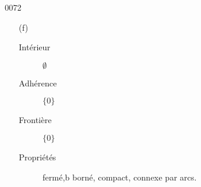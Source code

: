 \begin{corrige}{0072}
\begin{enumerate}
        \item[(f)] 
            \begin{description}
                \item[Intérieur]
                    \( \emptyset\)
                \item[Adhérence]
                    \( \{ 0 \}\)
                \item[Frontière]
                    \( \{ 0 \}\)
                \item[Propriétés]
                    fermé,b borné, compact, connexe par arcs.
            \end{description}
    \end{enumerate}
\end{corrige}
